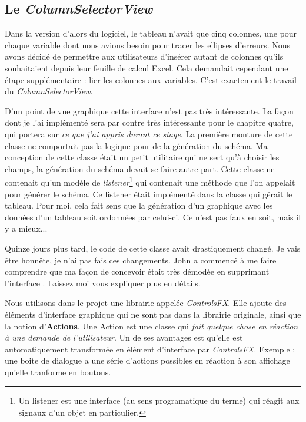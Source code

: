 %
%
\subsection{Le \textit{ColumnSelectorView}}
Dans la version d'alors du logiciel, le tableau n'avait que cinq colonnes, une pour chaque variable dont nous avions besoin pour tracer les ellipses d'erreurs. Nous avons décidé de permettre aux utilisateurs d'insérer autant de colonnes qu'ils souhaitaient depuis leur feuille de calcul Excel. Cela demandait cependant une étape supplémentaire : lier les colonnes aux variables. C'est exactement le travail du \textit{ColumnSelectorView}. 


D'un point de vue graphique cette interface n'est pas très intéressante. La façon dont je l'ai implémenté sera par contre très intéressante pour le chapitre quatre, qui portera sur \textit{ce que j'ai appris durant ce stage}. La première monture de cette classe ne comportait pas la logique pour de la génération du schéma. Ma conception de cette classe était un petit utilitaire qui ne sert qu'à choisir les champs, la génération du schéma devait se faire autre part. Cette classe ne contenait qu'un modèle de \textit{listener}\footnote{Un listener est une interface (au sens programatique du terme) qui réagit aux signaux d'un objet en particulier.} qui contenait une méthode que l'on appelait pour générer le schéma. Ce listener était implémenté dans la classe qui gêrait le tableau. Pour moi, cela fait sens que la génération d'un graphique avec les données d'un tableau soit ordonnées par celui-ci. Ce n'est pas faux en soit, mais il y a mieux...


Quinze jours plus tard, le code de cette classe avait drastiquement changé. Je vais être honnête, je n'ai pas fais ces changements. John a commencé à me faire comprendre que ma façon de concevoir était très démodée en supprimant l'interface %
. Laissez moi vous expliquer plus en détails.

Nous utilisons dans le projet une librairie appelée \textit{ControlsFX}. Elle ajoute des éléments d'interface graphique qui ne sont pas dans la librairie originale, ainsi que la notion d'\textbf{Actions}. Une Action est une classe qui \textit{fait quelque chose en réaction à une demande de l'utilisateur}. Un de ses avantages est qu'elle est automatiquement transformée en élément d'interface par \textit{ControlsFX}. Exemple : une boite de dialogue a une série d'actions possibles en réaction à son affichage qu'elle tranforme en boutons.

